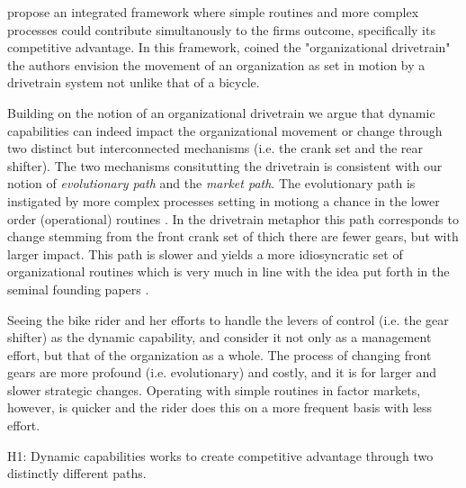 \documentclass[review,fleqn]{elsarticle}\usepackage[]{graphicx}\usepackage[]{color}
\begin{document}
\cite{DiStefano2014} propose an integrated framework where simple routines and more
complex processes could contribute simultanously to the firms outcome, specifically its
competitive advantage. In this framework, coined the "organizational drivetrain" the
authors envision the movement of an organization as set in motion by a drivetrain system
not unlike that of a bicycle.

Building on the notion of an organizational drivetrain we argue that dynamic capabilities
can indeed impact the organizational movement or change through two distinct but
interconnected mechanisms (i.e. the crank set and the rear shifter). The two mechanisms
consitutting the drivetrain is consistent with our notion of \emph{evolutionary path} and the \emph{market path}. The
evolutionary path is instigated by more complex processes setting in motiong a chance in
the lower order (operational) routines \cite{Collis1994,Winter2003}. In the drivetrain
metaphor this path corresponds to change stemming from the front crank set of thich there
are fewer gears, but with larger impact. This path is slower
and yields a more idiosyncratic set of organizational routines which is very much in line
with the idea put forth in the seminal founding papers \citep{Teece1997,Winter2003}.

Seeing the bike rider and her efforts to handle the levers of control (i.e. the gear
shifter) as the dynamic capability, and consider it not only as a management effort, but
that of the organization as a whole. The process of changing front gears are more profound
(i.e. evolutionary) and costly, and it is for larger and slower strategic
changes. Operating with simple routines in factor markets, however, is quicker and the
rider does this on a more frequent basis with less effort.

H1: Dynamic capabilities works to create competitive advantage through two distinctly
different paths.
\end{document}

